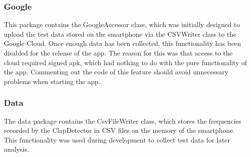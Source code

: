 \subsubsection{Google}
\label{sec:org3d3dca0}
This package contains the GoogleAccessor class, which was initially designed to upload the test data stored on the 
smartphone via the CSVWriter class to the Google Cloud. Once enough data has been collected, this functionality has 
been disabled for the release of the app. The reason for this was that access to the cloud required signed apk, 
which had nothing to do with the pure functionality of the app. Commenting out the code of this feature should 
avoid unnecessary problems when starting the app.

\subsubsection{Data}
\label{sec:orgdeb052b}
The data package contains the CsvFileWriter class, which stores the frequencies recorded by the ClapDetector in 
CSV files on the memory of the smartphone. This functionality was used during development to collect test data 
for later analysis.

